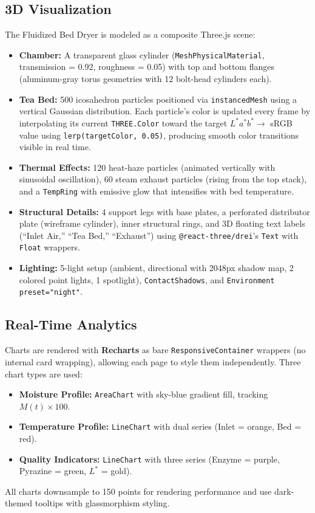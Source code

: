 ﻿\documentclass[12pt, a4paper]{report}
\begin{document}
\subsection{3D Visualization}
The Fluidized Bed Dryer is modeled as a composite Three.js scene:
\begin{itemize}
    \item \textbf{Chamber:} A transparent glass cylinder (\texttt{MeshPhysicalMaterial}, transmission = 0.92, roughness = 0.05) with top and bottom flanges (aluminum-gray torus geometries with 12 bolt-head cylinders each).
    \item \textbf{Tea Bed:} 500 icosahedron particles positioned via \texttt{instancedMesh} using a vertical Gaussian distribution. Each particle's color is updated every frame by interpolating its current \texttt{THREE.Color} toward the target $L^*a^*b^* \to$ sRGB value using \texttt{lerp(targetColor, 0.05)}, producing smooth color transitions visible in real time.
    \item \textbf{Thermal Effects:} 120 heat-haze particles (animated vertically with sinusoidal oscillation), 60 steam exhaust particles (rising from the top stack), and a \texttt{TempRing} with emissive glow that intensifies with bed temperature.
    \item \textbf{Structural Details:} 4 support legs with base plates, a perforated distributor plate (wireframe cylinder), inner structural rings, and 3D floating text labels (``Inlet Air,'' ``Tea Bed,'' ``Exhaust'') using \texttt{@react-three/drei}'s \texttt{Text} with \texttt{Float} wrappers.
    \item \textbf{Lighting:} 5-light setup (ambient, directional with 2048px shadow map, 2 colored point lights, 1 spotlight), \texttt{ContactShadows}, and \texttt{Environment preset="night"}.
\end{itemize}

\subsection{Real-Time Analytics}
Charts are rendered with \textbf{Recharts} as bare \texttt{ResponsiveContainer} wrappers (no internal card wrapping), allowing each page to style them independently. Three chart types are used:
\begin{itemize}
    \item \textbf{Moisture Profile:} \texttt{AreaChart} with sky-blue gradient fill, tracking $M(t) \times 100$.
    \item \textbf{Temperature Profile:} \texttt{LineChart} with dual series (Inlet = orange, Bed = red).
    \item \textbf{Quality Indicators:} \texttt{LineChart} with three series (Enzyme = purple, Pyrazine = green, $L^*$ = gold).
\end{itemize}
All charts downsample to 150 points for rendering performance and use dark-themed tooltips with glassmorphism styling.
\end{document}
